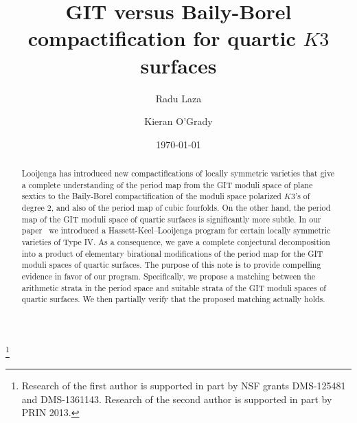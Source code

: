 \documentclass[11pt]{amsart}
\numberwithin{equation}{section}
\theoremstyle{plain}
\theoremstyle{remark}
\theoremstyle{definition}
\begin{document}
 \title[Moduli of quartic $K3$s (2)]{GIT versus Baily-Borel compactification for quartic $K3$ surfaces}
 
 \author[R. Laza]{Radu Laza}
\address{Stony Brook University,  Stony Brook, NY 11794, USA}

 \author[K. O'Grady]{Kieran O'Grady}
\address{``Sapienza'' Universit\'a di Roma, Rome, Italy}
\date{\today}

\begin{abstract}
Looijenga has  introduced new compactifications of locally symmetric varieties that give a complete understanding  
of the period map from the GIT moduli space of plane sextics to the Baily-Borel compactification   of the moduli space  polarized $K3$'s of degree $2$, and also  of the period map of cubic fourfolds. On the other hand, the period map of the GIT moduli space of quartic surfaces  is significantly more subtle.  In our paper~\cite{log1} we introduced a Hassett-Keel--Looijenga program for certain locally symmetric varieties of Type IV.  As a consequence, we gave a complete conjectural decomposition  into a product of elementary birational modifications of  the period map  for  the GIT moduli spaces of quartic surfaces. 
 The purpose of this note is to provide compelling evidence in favor of our program. 
Specifically, we propose a matching between the arithmetic strata in the period space and suitable  strata of the GIT moduli spaces of quartic surfaces.   We then partially verify that the proposed matching actually holds.
\end{abstract}

\thanks{Research of the first author is supported in part by NSF grants DMS-125481 and DMS-1361143. Research of the second author is supported in part by PRIN 2013.}
  \maketitle
  





  
\end{document}
